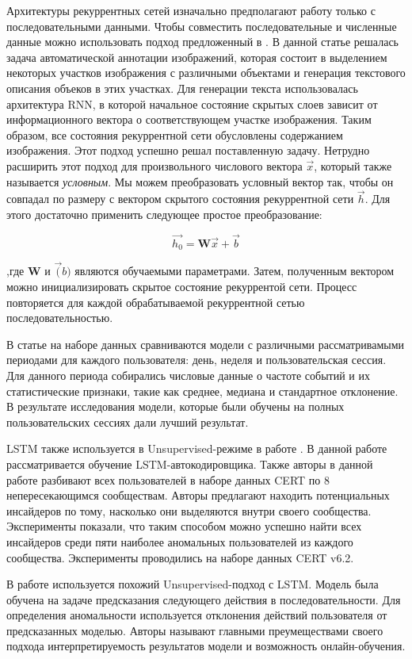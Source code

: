 Архитектуры рекуррентных сетей изначально предполагают работу только с последовательными данными. Чтобы совместить последовательные и численные данные можно использовать подход предложенный в \cite{karpathyDeepVisualSemanticAlignments2015}. В данной статье решалась задача автоматической аннотации изображений, которая состоит в выделением некоторых участков изображения с различными объектами и генерация текстового описания объеков в этих участках. Для генерации текста использовалась архитектура RNN, в которой начальное состояние скрытых слоев зависит от информационного вектора о соответствующем участке изображения. Таким образом, все состояния рекуррентной сети обусловлены содержанием изображения. Этот подход успешно решал поставленную задачу.
Нетрудно расширить этот подход для произвольного числового вектора $\overrightarrow{x}$, который также называется \textit{условным}. Мы можем преобразовать условный вектор так, чтобы он совпадал по размеру с вектором скрытого состояния рекуррентной сети $\overrightarrow{h}$. Для этого достаточно применить следующее простое преобразование:

$$\overrightarrow{h_0} = \textbf{W}\overrightarrow{x} + \overrightarrow{b}$$

,где $\textbf{W}$ и $\overrightarrow(b)$ являются обучаемыми параметрами. Затем, полученным вектором можно инициализировать скрытое состояние рекуррентой сети. Процесс повторяется для каждой обрабатываемой рекуррентной сетью последовательностью.

В статье \cite{leAnalyzingDataGranularity2020b} на наборе данных сравниваются модели с различными рассматривамыми периодами для каждого пользователя: день, неделя и пользовательская сессия. Для данного периода собирались числовые данные о частоте событий и их статистические признаки, такие как среднее, медиана и стандартное отклонение. В результате исследования модели, которые были обучены на полных пользовательских сессиях дали лучший результат.

LSTM также используется в Unsupervised-режиме в работе \cite{paulLACLSTMAUTOENCODER}. В данной работе рассматривается обучение LSTM-автокодировщика. Также авторы в данной работе разбивают всех пользователей в наборе данных CERT по 8 непересекающимся сообществам. Авторы предлагают находить потенциальных инсайдеров по тому, насколько они выделяются внутри своего сообщества. Эксперименты показали, что таким способом можно успешно найти всех инсайдеров среди пяти наиболее аномальных пользователей из каждого сообщества. Эксперименты проводились на наборе данных CERT v6.2.

В работе \cite{tuorDeepLearningUnsupervised2017} используется похожий Unsupervised-подход с LSTM. Модель была обучена на задаче предсказания следующего действия в последовательности. Для определения аномальности используется отклонения действий пользователя от предсказанных моделью. Авторы называют главными преумеществами своего подхода интерпретируемость результатов модели и возможность онлайн-обучения.
